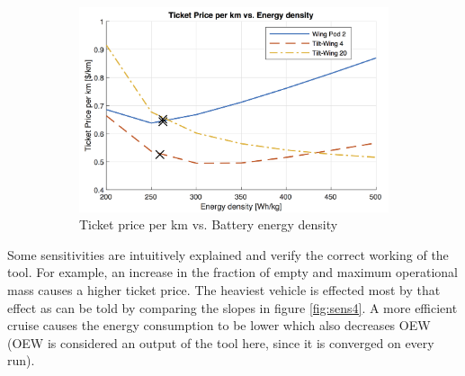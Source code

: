 \begin{figure}[h]
\begin{subfigure}[t]{0.33\textwidth}
    \includegraphics[width=\textwidth]{Figures/Edens_TPrice_perkmNOPAD.png}
    \captionsetup{justification=centering}
    \caption{Ticket price per km vs. Battery energy density}
    \label{fig:sens6}
\end{subfigure}
\captionsetup{justification=centering}
\caption{}
\label{fig:sens456}
\end{figure}


Some sensitivities are intuitively explained and verify the correct working of the tool. For example, an increase in the fraction of empty and maximum operational mass causes a higher ticket price. The heaviest vehicle is effected most by that effect as can be told by comparing the slopes in figure \ref{fig:sens4}. A more efficient cruise causes the energy consumption to be lower which also decreases OEW (OEW is considered an output of the tool here, since it is converged on every run). 

